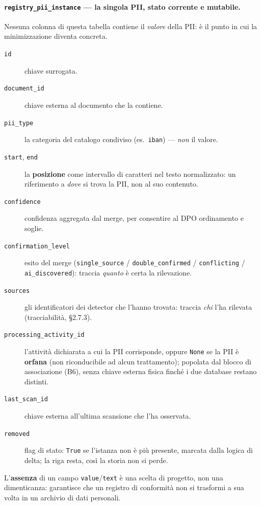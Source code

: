 \paragraph{\texttt{registry\_pii\_instance} --- la singola PII, stato corrente e mutabile.}
Nessuna colonna di questa tabella contiene il \emph{valore} della PII: è il punto in cui la minimizzazione diventa concreta.
\begin{description}
	\item[\texttt{id}] chiave surrogata.
	\item[\texttt{document\_id}] chiave esterna al documento che la contiene.
	\item[\texttt{pii\_type}] la categoria del catalogo condiviso (es.\ \texttt{iban}) --- \emph{non} il valore.
	\item[\texttt{start}, \texttt{end}] la \textbf{posizione} come intervallo di caratteri nel testo normalizzato: un riferimento a \emph{dove} si trova la PII, non al suo contenuto.
	\item[\texttt{confidence}] confidenza aggregata dal merge, per consentire al DPO ordinamento e soglie.
	\item[\texttt{confirmation\_level}] esito del merge (\texttt{single\_source} / \texttt{double\_confirmed} / \texttt{conflicting} / \texttt{ai\_discovered}): traccia \emph{quanto} è certa la rilevazione.
	\item[\texttt{sources}] gli identificatori dei detector che l'hanno trovata: traccia \emph{chi} l'ha rilevata (tracciabilità, §2.7.3).
	\item[\texttt{processing\_activity\_id}] l'attività dichiarata a cui la PII corrisponde, oppure \texttt{None} se la PII è \textbf{orfana} (non riconducibile ad alcun trattamento); popolata dal blocco di associazione (B6), senza chiave esterna fisica finché i due database restano distinti.
	\item[\texttt{last\_scan\_id}] chiave esterna all'ultima scansione che l'ha osservata.
	\item[\texttt{removed}] flag di stato: \texttt{True} se l'istanza non è più presente, marcata dalla logica di delta; la riga resta, così la storia non si perde.
\end{description}
L'\textbf{assenza} di un campo \texttt{value}/\texttt{text} è una scelta di progetto, non una dimenticanza: garantisce che un registro di conformità non si trasformi a sua volta in un archivio di dati personali.

